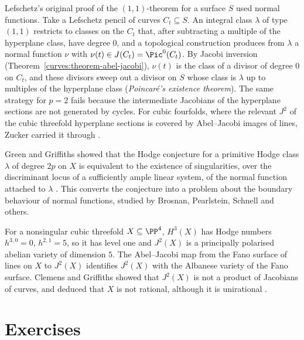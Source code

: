 \begin{remark}\label{vhs:remark-poincare-lefschetz}
Lefschetz's original proof of the $(1,1)$-theorem for a surface $S$ used normal functions. Take a Lefschetz pencil of curves $C_t \subseteq S$. An integral class $\lambda$ of type $(1,1)$ restricts to
classes on the $C_t$ that, after subtracting a multiple of the hyperplane class, have degree $0$, and a topological construction produces from $\lambda$ a normal function $\nu$ with
$\nu(t) \in J(C_t) = \Pic^0(C_t)$. By Jacobi inversion (Theorem~\ref{curves:theorem-abel-jacobi}), $\nu(t)$ is the class of a divisor of degree $0$ on $C_t$, and these divisors sweep out a divisor on $S$
whose class is $\lambda$ up to multiples of the hyperplane class (\emph{Poincar\'e's existence theorem}). The same strategy for $p = 2$ fails because the intermediate Jacobians of the
hyperplane sections are not generated by cycles. For cubic fourfolds, where the relevant $J^2$ of the cubic threefold hyperplane sections is covered by Abel--Jacobi images of
lines, Zucker carried it through \cite{zucker-1977}.
\end{remark}

\begin{remark}\label{vhs:remark-green-griffiths}
Green and Griffiths showed that the Hodge conjecture for a primitive Hodge class $\lambda$ of degree $2p$ on $X$ is equivalent to the existence of singularities, over the discriminant locus of a
sufficiently ample linear system, of the normal function attached to $\lambda$ \cite{green-griffiths-2007}. This converts the conjecture into a problem about the boundary behaviour of normal
functions, studied by Brosnan, Pearlstein, Schnell and others.
\end{remark}

\begin{example}\label{vhs:example-cubic-threefold}
For a nonsingular cubic threefold $X \subseteq \PP^4$, $H^3(X)$ has Hodge numbers $h^{3,0} = 0$, $h^{2,1} = 5$, so it has level one and $J^2(X)$ is a principally polarised abelian variety of
dimension $5$. The Abel--Jacobi map from the Fano surface of lines on $X$ to $J^2(X)$ identifies $J^2(X)$ with the Albanese variety of the Fano surface. Clemens and Griffiths showed that
$J^2(X)$ is not a product of Jacobians of curves, and deduced that $X$ is not rational, although it is unirational \cite{clemens-griffiths-1972}.
\end{example}

\section{Exercises}\label{vhs:section-exercises}

